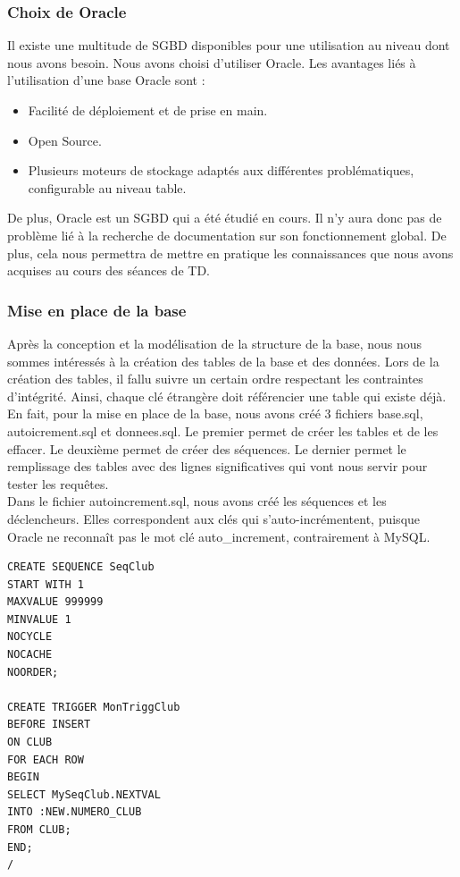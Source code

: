 \documentclass{article}
\begin{document}
\subsubsection*{Choix de Oracle}
Il existe une multitude de SGBD disponibles pour une utilisation au niveau dont nous avons besoin. Nous avons choisi d'utiliser Oracle. Les avantages liés à l'utilisation d'une base Oracle sont :
\begin{itemize}
\item Facilité de déploiement et de prise en main.
\item Open Source.
\item Plusieurs moteurs de stockage adaptés aux différentes problématiques, configurable au niveau table. 
\end{itemize}

De plus, Oracle est un SGBD qui a été étudié en cours. Il n'y aura donc pas de problème lié à la recherche de documentation sur son fonctionnement global. De plus, cela nous permettra de mettre en pratique les connaissances que nous avons acquises au cours des séances de TD.

\subsubsection*{Mise en place de la base}
Après la conception et la modélisation de la structure de la base, nous nous sommes intéressés à la création des tables de la base et des données. 
Lors de la création des tables, il fallu suivre un certain ordre respectant les contraintes d'intégrité. Ainsi, chaque clé étrangère doit référencier 
une table qui existe déjà. En fait, pour la mise en place de la base, nous avons créé 3 fichiers base.sql, autoicrement.sql et donnees.sql. Le premier permet de créer les tables et de les effacer. Le deuxième permet de créer des séquences. Le dernier permet 
le remplissage des tables avec des lignes significatives qui vont nous servir pour tester les requêtes. \\

Dans le fichier autoincrement.sql, nous avons créé les séquences et les déclencheurs. Elles correspondent aux clés qui s'auto-incrémentent, puisque Oracle ne reconnaît pas le mot clé auto\_increment, contrairement à MySQL. 


\begin{verbatim}
CREATE SEQUENCE SeqClub
START WITH 1
MAXVALUE 999999
MINVALUE 1
NOCYCLE
NOCACHE
NOORDER;

CREATE TRIGGER MonTriggClub
BEFORE INSERT
ON CLUB
FOR EACH ROW
BEGIN
SELECT MySeqClub.NEXTVAL
INTO :NEW.NUMERO_CLUB
FROM CLUB;
END;
/
\end{verbatim}
\end{document}
